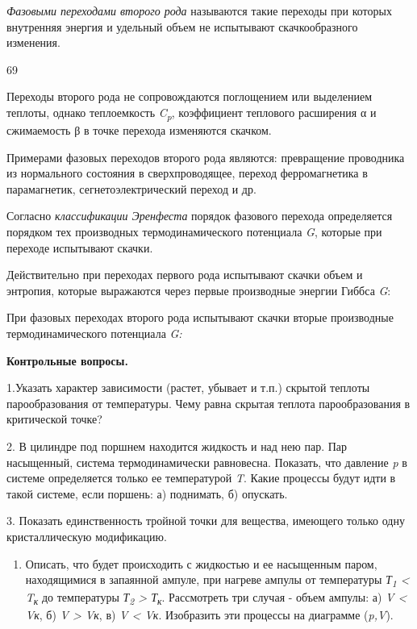 \emph{Фазовыми переходами второго рода} называются такие переходы при
которых внутренняя энергия и удельный объем не испытывают
скачкообразного изменения.

69

Переходы второго рода не сопровождаются поглощением или выделением
теплоты, однако теплоемкость \emph{C\textsubscript{p}}, коэффициент
теплового расширения α и сжимаемость β в точке перехода изменяются
скачком.

Примерами фазовых переходов второго рода являются: превращение
проводника из нормального состояния в сверхпроводящее, переход
ферромагнетика в парамагнетик, сегнетоэлектрический переход и др.

Согласно \emph{классификации Эренфеста} порядок фазового перехода
определяется порядком тех производных термодинамического потенциала
\emph{G}, которые при переходе испытывают скачки.

Действительно при переходах первого рода испытывают скачки объем и
энтропия, которые выражаются через первые производные энергии Гиббса
\emph{G}:


При фазовых переходах второго рода испытывают скачки вторые производные
термодинамического потенциала \emph{G:}


\textbf{Контрольные вопросы.}

1.Указать характер зависимости (растет, убывает и т.п.) скрытой теплоты
парообразования от температуры. Чему равна скрытая теплота
парообразования в критической точке?

2. В цилиндре под поршнем находится жидкость и над нею пар. Пар
насыщенный, система термодинамически равновесна. Показать, что давление
\emph{p} в системе определяется только ее температурой \emph{T}. Какие
процессы будут идти в такой системе, если поршень: а) поднимать, б)
опускать.

3. Показать единственность тройной точки для вещества, имеющего только
одну кристаллическую модификацию.

\begin{enumerate}
\def\labelenumi{\arabic{enumi}.}
\setcounter{enumi}{3}
\item
  Описать, что будет происходить с жидкостью и ее насыщенным паром,
  находящимися в запаянной ампуле, при нагреве ампулы от температуры
  \emph{Т\textsubscript{1} \textless{} T\textsubscript{к}} до
  температуры \emph{Т\textsubscript{2} \textgreater{}
  Т\textsubscript{к}}. Рассмотреть три случая - объем ампулы: а) \emph{V
  \textless{} Vк}, б) \emph{V \textgreater{} Vк}, в) \emph{V \textless{}
  Vк}. Изобразить эти процессы на диаграмме (\emph{p,V}).
\end{enumerate}

